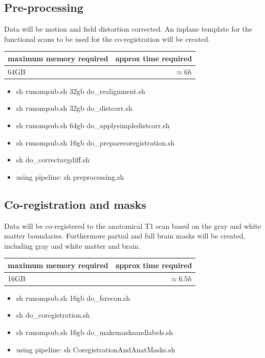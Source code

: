\documentclass[12pt,a4paper]{scrartcl}
\begin{document}
\subsection{Pre-processing}
Data will be motion and field distortion corrected. An inplane template for the functional scans to be used for the co-registration  will be created.
\begin{table}[h]
\begin{tabular}{l | r}
\toprule
maximum memory required & approx time required\\\toprule
64GB & $\approx 6h$ \\\bottomrule
\end{tabular}
\end{table}
\begin{itemize}
\item sh runonqsub.sh 32gb do\_realignment.sh
\item sh runonqsub.sh 32gb do\_distcorr.sh
\item sh runonqsub.sh 64gb do\_applysimpledistcorr.sh
\item sh runonqsub.sh 16gb do\_preparecoregistration.sh
\item sh do\_correctavgdiff.sh
\item using pipeline: sh preprocessing.sh
\end{itemize}
\subsection{Co-registration and masks}
Data will be co-registered to the anatomical T1 scan based on the gray and white matter boundaries. Furthermore partial and full brain masks will be created, including gray and white matter and brain.
\begin{table}[h]
\begin{tabular}{l | r}
\toprule
maximum memory required & approx time required\\\toprule
16GB & $\approx 6.5h$ \\\bottomrule
\end{tabular}
\end{table}
\begin{itemize}
\item sh runonqsub.sh 16gb do\_fsrecon.sh
\item sh do\_coregistration.sh
\item sh runonqsub.sh 16gb do\_makemasksandlabels.sh
\item using pipeline: sh CoregistrationAndAnatMasks.sh
\end{itemize}
\end{document}
